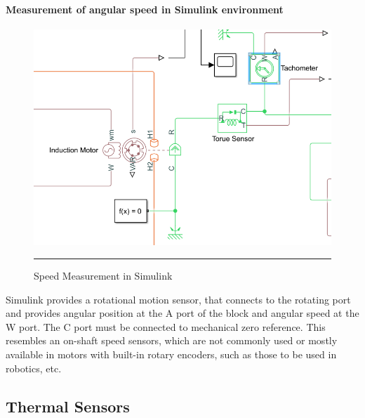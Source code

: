 \paragraph{Measurement of angular speed in Simulink environment}
\begin{figure}[htbp]
	\centering
		\includegraphics[width = 4.5in]{./Figures/MS/fig328.png}
		\rule{35em}{0.5pt}
	\caption{Speed Measurement in Simulink}
	\label{fig:Speed Measurement in Simulink} 
\end{figure}
Simulink provides a rotational motion sensor, that connects to the rotating port and provides angular position at the A port of the block and angular speed at the W port. The C port must be connected to mechanical zero reference. This resembles an on-shaft speed sensors, which are not commonly used or mostly available in motors with built-in rotary encoders, such as those to be used in robotics, etc.

\subsection{Thermal Sensors}
